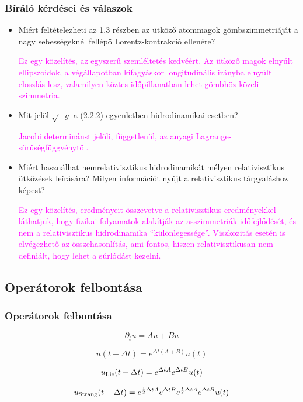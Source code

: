 \documentclass{beamer}
\begin{document}
\begin{frame}[noframenumbering]
\frametitle{Bíráló kérdései és válaszok}
\begin{itemize}
\fontsize{9}{14}\selectfont

\item Miért feltételezheti az 1.3 részben az ütköző atommagok gömbszimmetriáját a nagy sebességeknél fellépő Lorentz-kontrakció ellenére? 


\textcolor{magenta}{Ez egy közelítés, az egyszerű szemléltetés kedvéért. Az ütköző magok elnyúlt ellipszoidok, a végállapotban kifagyáskor longitudinális irányba elnyúlt eloszlás lesz, valamilyen köztes időpillanatban lehet gömbhöz közeli szimmetria.}

\item Mit jelöl $\sqrt{-g}$ a (2.2.2) egyenletben hidrodinamikai esetben?

\textcolor{magenta}{Jacobi determinánst jelöli, függetlenül, az anyagi Lagrange-sűrűségfüggvénytől.}

\item Miért használhat nemrelativisztikus hidrodinamikát mélyen relativisztikus ütközések leírására? Milyen információt nyújt a relativisztikus tárgyaláshoz képest?

\textcolor{magenta}{Ez egy közelítés, eredményeit összevetve a relativisztikus eredményekkel láthatjuk, hogy fizikai folyamatok alakítják az asszimmetriák időfejlődését, és nem a relativisztikus hidrodinamika ``különlegessége''. Viszkozitás esetén is elvégezhető az összehasonlítás, ami fontos, hiszen relativisztikusan nem definiált, hogy lehet a súrlódást kezelni.}

\end{itemize}
\end{frame}


\subsection{Operátorok felbontása}
\begin{frame}[noframenumbering]
\frametitle{Operátorok felbontása}
\begin{large}
\begin{equation*}
\partial_t u = Au+Bu
\end{equation*}

\begin{equation*}
u(t+\Delta t)=e^{\Delta t(A+B)}u(t)
\end{equation*}


\begin{equation*}
u_{\rm{Lie}}(t+\Delta t)=e^{\Delta tA}e^{\Delta tB}u(t)
\end{equation*}

\begin{equation*}
u_{\rm{Strang}}(t+\Delta t)=e^{\frac{1}{2}\Delta tA}e^{\Delta tB}e^{\frac{1}{2}\Delta tA}e^{\Delta tB}u(t)
\end{equation*}
\end{large}
\end{frame}
\end{document}
